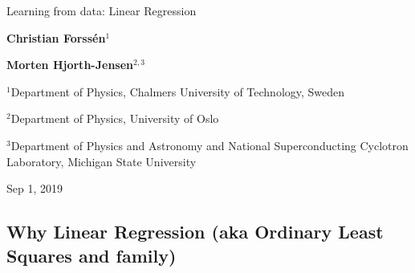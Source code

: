 \documentclass[%
oneside,                 %
final,                   %
10pt]{article}
\begin{document}

\newcommand{\exercisesection}[1]{\subsection*{#1}}







\thispagestyle{empty}

\begin{center}
{\LARGE\bf
\begin{spacing}{1.25}
Learning from data: Linear Regression
\end{spacing}
}
\end{center}


\begin{center}
{\bf Christian Forssén${}^{1}$} \\ [0mm]
\end{center}


\begin{center}
{\bf Morten Hjorth-Jensen${}^{2, 3}$} \\ [0mm]
\end{center}

\begin{center}
\centerline{{\small ${}^1$Department of Physics, Chalmers University of Technology, Sweden}}
\centerline{{\small ${}^2$Department of Physics, University of Oslo}}
\centerline{{\small ${}^3$Department of Physics and Astronomy and National Superconducting Cyclotron Laboratory, Michigan State University}}
\end{center}
    

\begin{center}
Sep 1, 2019
\end{center}

\vspace{1cm}


\subsection{Why Linear Regression (aka Ordinary Least Squares and family)}
\end{document}
